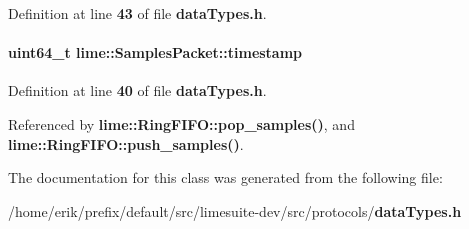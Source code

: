 Definition at line {\bf 43} of file {\bf data\+Types.\+h}.

\paragraph[{timestamp}]{\setlength{\rightskip}{0pt plus 5cm}uint64\+\_\+t lime\+::\+Samples\+Packet\+::timestamp}\label{classlime_1_1SamplesPacket_ab733014b8dfe33165392343566d58830}


Definition at line {\bf 40} of file {\bf data\+Types.\+h}.



Referenced by {\bf lime\+::\+Ring\+F\+I\+F\+O\+::pop\+\_\+samples()}, and {\bf lime\+::\+Ring\+F\+I\+F\+O\+::push\+\_\+samples()}.



The documentation for this class was generated from the following file\+:\begin{DoxyCompactItemize}
\item 
/home/erik/prefix/default/src/limesuite-\/dev/src/protocols/{\bf data\+Types.\+h}\end{DoxyCompactItemize}
